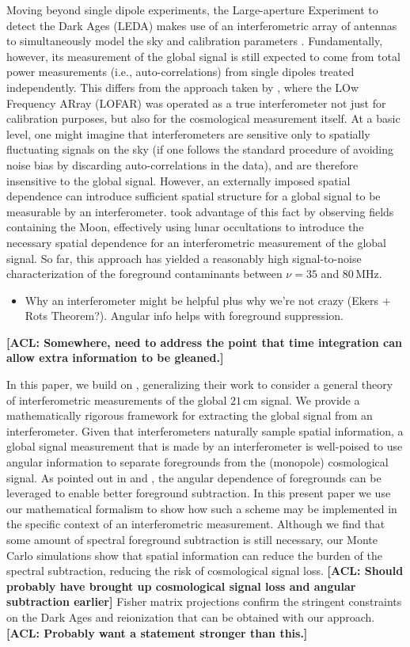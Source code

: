 \documentclass[twolcolumn,apj]{emulateapj}
\newcommand{\acl}[1]{{\color{red} \textbf{[ACL:  #1]}}}
\begin{document}
Moving beyond single dipole experiments, the Large-aperture Experiment to detect the Dark Ages (LEDA) makes use of an interferometric array of antennas to simultaneously model the sky and calibration parameters \citep{BernardiLEDA}.  Fundamentally, however, its measurement of the global signal is still expected to come from total power measurements (i.e., auto-correlations) from single dipoles treated independently.  This differs from the approach taken by \citet{VedanthamLOFAR2}, where the LOw Frequency ARray (LOFAR) was operated as a true interferometer not just for calibration purposes, but also for the cosmological measurement itself.  At a basic level, one might imagine that interferometers are sensitive only to spatially fluctuating signals on the sky (if one follows the standard procedure of avoiding noise bias by discarding auto-correlations in the data), and are therefore insensitive to the global signal.  However, an externally imposed spatial dependence can introduce sufficient spatial structure for a global signal to be measurable by an interferometer.  \citet{VedanthamLOFAR2} took advantage of this fact by observing fields containing the Moon, effectively using lunar occultations to introduce the necessary spatial dependence for an interferometric measurement of the global signal.  So far, this approach has yielded a reasonably high signal-to-noise characterization of the foreground contaminants between $\nu =35$ and $80\,\textrm{MHz}$.

\begin{itemize}
\item Why an interferometer might be helpful plus why we're not crazy (Ekers + Rots Theorem?).  Angular info helps with foreground suppression.
\end{itemize}
\acl{Somewhere, need to address the point that time integration can allow extra information to be gleaned.}

In this paper, we build on \citet{VedanthamLOFAR2}, generalizing their work to consider a general theory of interferometric measurements of the global $21\,\textrm{cm}$ signal.  We provide a mathematically rigorous framework for extracting the global signal from an interferometer.  Given that interferometers naturally sample spatial information, a global signal measurement that is made by an interferometer is well-poised to use angular information to separate foregrounds from the (monopole) cosmological signal.  As pointed out in \citep{L13} and \citep{Liu_Switzer_2014}, the angular dependence of foregrounds can be leveraged to enable better foreground subtraction.  In this present paper we use our mathematical formalism to show how such a scheme may be implemented in the specific context of an interferometric measurement.  Although we find that some amount of spectral foreground subtraction is still necessary, our Monte Carlo simulations show that spatial information can reduce the burden of the spectral subtraction, reducing the risk of cosmological signal loss.  \acl{Should probably have brought up cosmological signal loss and angular subtraction earlier}  Fisher matrix projections confirm the stringent constraints on the Dark Ages and reionization that can be obtained with our approach.  \acl{Probably want a statement stronger than this.}
\end{document}
